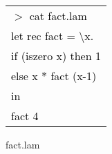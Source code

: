 \documentclass[xcolor=table]{beamer}
\newcommand{\tab}{\hspace*{1.2em}}
\begin{document}
\begin{frame}
\begin{block}
{\begin{columns}[t]
\begin{column}[T]{5cm}
\begin{figure}[h!]
\begin{footnotesize}
\begin{tabular}{l}
			  	 \textcolor{black}{
			      $>$ cat fact.lam} \\
			      \textcolor{black}{let rec fact = \textbackslash x. } \\ 
			      \textcolor{black}{\tab if (iszero x) then 1} \\ 
			      \textcolor{black}{\tab else x * fact (x-1)} \\
			      \textcolor{black}{in} \\
			      \textcolor{black}{\tab fact 4} \\
				\end{tabular}	
			  \end{footnotesize}			  
			  \caption{fact.lam}
		 \end{figure}	          
     \end{column}
     \end{columns}
}
\end{block}
\end{frame}
\end{document}
